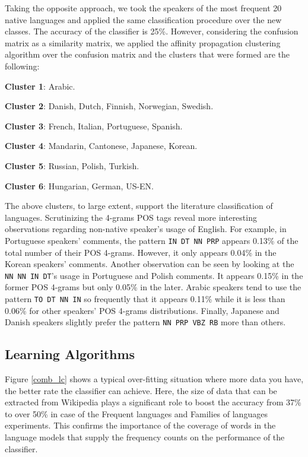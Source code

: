 \documentclass[10pt,a5paper,twoside]{article}
\begin{document}
Taking the opposite approach, we took the speakers of the most frequent 20
native languages and applied the same classification procedure over the new
classes. The accuracy of the classifier is 25\%. However, considering the
confusion matrix as a similarity matrix, we applied the affinity propagation
clustering algorithm \cite{sklearn} over the confusion matrix and the clusters
that were formed are the following:
\begin{compactitem}
\item \textbf{Cluster 1}: Arabic.
\item \textbf{Cluster 2}: Danish, Dutch, Finnish, Norwegian, Swedish.
\item \textbf{Cluster 3}: French, Italian, Portuguese, Spanish.
\item \textbf{Cluster 4}: Mandarin, Cantonese, Japanese, Korean.
\item \textbf{Cluster 5}: Russian, Polish, Turkish.
\item \textbf{Cluster 6}: Hungarian, German, US-EN.
\end{compactitem}

The above clusters, to large extent, support the literature classification of
languages. Scrutinizing the 4-grams POS tags reveal more interesting
observations regarding non-native speaker's usage of English. For example,
in Portuguese speakers' comments, the pattern \verb+IN DT NN PRP+ appears 0.13\%
of the total number of their POS 4-grams. However, it only appears
0.04\% in the Korean speakers' comments. Another observation can be seen by
looking at the \verb+NN NN IN DT+'s usage in Portuguese and Polish comments. It
appears 0.15\% in the former POS 4-grams but only 0.05\% in the later. Arabic
speakers tend to use the pattern \verb+TO DT NN IN+ so frequently that it
appears 0.11\% while it is less than 0.06\% for other speakers' POS 4-grams
distributions. Finally, Japanese and Danish speakers slightly prefer the pattern
\verb+NN PRP VBZ RB+ more than others.

\subsection{Learning Algorithms}

Figure \ref{comb_lc} shows a typical over-fitting situation where more data
you have, the better rate the classifier can achieve. Here, the size of data that
can be extracted from Wikipedia plays a significant role to boost the accuracy
from 37\% to over 50\% in case of the Frequent languages and Families of
languages experiments. This confirms the importance of the coverage of words in
the language models that supply the frequency counts on the performance of the classifier.
\end{document}
